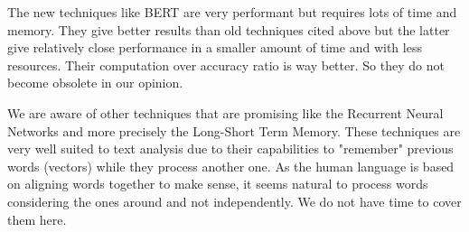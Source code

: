 \documentclass[11pt, a4paper, twocolumn]{article}
\begin{document}
The new techniques like BERT are very performant but requires lots of time and memory. They give better results than old techniques cited above but the latter give relatively close 
performance in a smaller amount of time and with less resources. Their computation over accuracy ratio is way better. So they do not become obsolete in our opinion.

We are aware of other techniques that are promising like the Recurrent Neural Networks and more precisely the Long-Short Term Memory. These techniques 
are very well suited to text analysis due to their capabilities to "remember" previous words (vectors) while they process another one. As the human 
language is based on aligning words together to make sense, it seems natural to process words considering the ones around and not independently. 
We do not have time to cover them here.

\clearpage
\onecolumn
\end{document}
